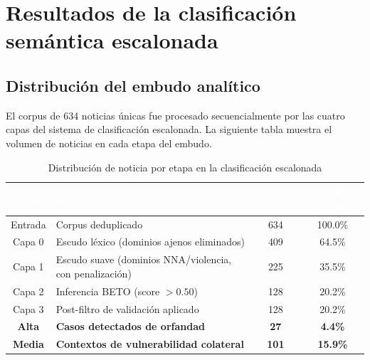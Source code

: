 \section{Resultados de la clasificación semántica escalonada}
\label{sec:res_deteccion}

\subsection{Distribución del embudo analítico}
\label{subsec:res_embudo}

El corpus de 634 noticias únicas fue procesado secuencialmente por las cuatro capas del
sistema de clasificación escalonada. La siguiente tabla muestra el volumen
de noticias en cada etapa del embudo.

\vspace{0.5cm}
\begin{table}[htbp]
\centering
\caption{Distribución de noticia por etapa en la clasificación escalonada}
\label{tab:res_embudo}
\renewcommand{\arraystretch}{1.3}
\begin{tabular}{|c|p{5.5cm}|c|c|}
\hline
\rowcolor{black}
\textcolor{white}{\textbf{Capa}} &
\textcolor{white}{\textbf{Etapa}} &
\textcolor{white}{\textbf{Noticias}} &
\textcolor{white}{\textbf{\% del corpus}} \\
\hline
Entrada & Corpus deduplicado & 634 & 100.0\% \\
\hline
Capa 0 & Escudo léxico (dominios ajenos eliminados) & 409 & 64.5\% \\
\hline
Capa 1 & Escudo suave (dominios NNA/violencia, con penalización) & 225 & 35.5\% \\
\hline
Capa 2 & Inferencia BETO (score $> 0.50$) & 128 & 20.2\% \\
\hline
Capa 3 & Post-filtro de validación aplicado & 128 & 20.2\% \\
\hline
\textbf{Alta} & \textbf{Casos detectados de orfandad} & \textbf{27} & \textbf{4.4\%} \\
\hline
\textbf{Media} & \textbf{Contextos de vulnerabilidad colateral} & \textbf{101} & \textbf{15.9\%} \\
\hline
\end{tabular}
\end{table}
\vspace{0.4cm}

